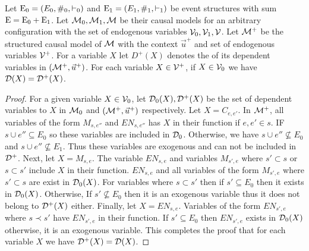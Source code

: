 \begin{lemma}
    Let $\mathrm{E}_0 = (E_0,\#_0,\vdash_0)$ and $\mathrm{E}_1 = (E_1,\#_1,\vdash_1)$
    be event structures with sum $\mathrm{E} = \mathrm{E}_0 + \mathrm{E}_1$.
    Let $\mathcal{M}_0,\mathcal{M}_1,\mathcal{M}$ be their causal models for an arbitrary
    configuration with the set of endogenous variables $\mathcal{V}_0,\mathcal{V}_1,\mathcal{V}$.
    Let $\mathcal{M}^+$ be the structured causal model of $\mathcal{M}$ with the context
    $\vec u^+$ and set of endogenous variables $\mathcal{V}^+$.
    For a variable $X$ let $D^+(X)$ denotes the of its dependent variables
    in $(\mathcal{M}^+,\vec u^+)$.
    For each variable $X \in \mathcal{V}^+$, if $X \in \mathcal{V}_0$
    we have $\mathcal{D}(X) = \mathcal{D}^+(X)$.
\end{lemma}
\begin{proof}
    For a given variable $X \in \mathcal{V}_0$, let $\mathcal{D}_0(X),\mathcal{D}^+(X)$
    be the set of dependent variables to $X$ in $\mathcal{M}_0$ and $(\mathcal{M}^+,\vec u^+)$
    respectively.
    Let $X = C_{e,e'}$.
    In $\mathcal{M}^+$, all variables of the form $M_{s,e''}$ and $EN_{s,e''}$ has
    $X$ in their function if $e,e' \in s$.
    IF $s \cup e'' \subseteq E_0$ so these variables are included in
    $\mathcal{D}_0$.
    Otherwise, we have $s\cup e'' \not \subseteq E_0$ and
    $s \cup e'' \not \subseteq E_1$.
    Thus these variables are exogenous and can not be included in $\mathcal{D}^+$.
    Next, let $X = M_{s,e}$.
    The variable $EN_{s,e}$ and variables $M_{s',e}$ where
    $s' \subset s$ or $s \subset s'$ include $X$ in their function.
    $EN_{s,e}$ and all variables of the form $M_{s',e}$ where
    $s' \subset s$ are exist in $\mathcal{D}_0(X)$.
    For variables where $s \subset s'$ then if $s' \subseteq E_0$ then
    it exists in $\mathcal{D}_0(X)$.
    Otherwise,
    If $s' \not \subseteq E_0$ then it is an exogenous variable thus it does
    not belong to $\mathcal{D}^+(X)$ either.
    Finally, let $X = EN_{s,e}$.
    Variables of the form $EN_{s',e}$ where $s \prec s'$ have $EN_{s',e}$
    in their function.
    If $s' \subseteq E_0$ then $EN_{s',e}$ exists in $\mathcal{D}_0(X)$
    otherwise, it is an exogenous variable.
    This completes the proof that for each variable $X$ we have
    $\mathcal{D}^+(X) = \mathcal{D}(X)$.
\end{proof}

